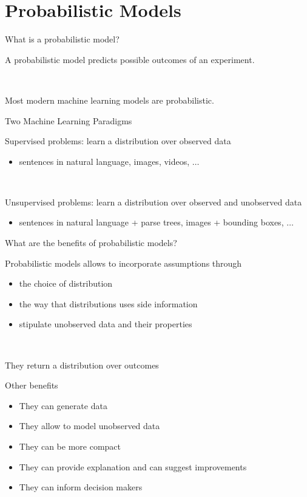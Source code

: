 \frame{\tableofcontents}

\section{Probabilistic Models}


\begin{frame}{What is a probabilistic model?}

	A probabilistic model predicts possible outcomes of an experiment. 
	
	~
	
	Most modern machine learning models are probabilistic.	

\end{frame}

\begin{frame}{Two Machine Learning Paradigms}

	Supervised problems: \alert{learn a distribution over observed data}
	\begin{itemize}
		\item sentences in natural language, images, videos, $\ldots$
	\end{itemize}
	
	~
	
	Unsupervised problems: \alert{learn a distribution over observed and unobserved data}
	\begin{itemize}
		\item sentences in natural language + parse trees, images + bounding boxes, $\ldots$
	\end{itemize}
\end{frame}

\begin{frame}{What are the benefits of probabilistic models?}

	Probabilistic models allows to incorporate assumptions through
	\begin{itemize}
		\item the choice of distribution
		\item the way that distributions uses side information
		\item stipulate unobserved data and their properties
	\end{itemize}
	
	~
	
	They return a distribution over outcomes	
	
\end{frame}

\begin{frame}{Other benefits}

	\begin{itemize}
		\item They can generate data
		\item They allow to model unobserved data
		\item They can be more compact
		\item They can provide explanation and can suggest improvements
		\item They can inform decision makers
	\end{itemize}
	
\end{frame}



